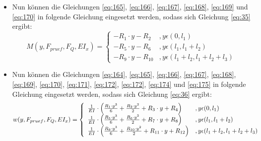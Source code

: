 \begin{itemize}
\begin{equation}
	\end{equation}
	\item Nun können die Gleichungen \ref{eq:165}, \ref{eq:166}, \ref{eq:167}, \ref{eq:168}, \ref{eq:169} und \ref{eq:170} in folgende Gleichung eingesetzt werden, sodass sich Gleichung \ref{eq:35} ergibt:
	\begin{equation}
		M(y,F_{pruef},F_{Q},EI_{x})=\left\{\begin{array}{ll}
			-R_{1}\cdot y - R_{2}&,y\epsilon (0,l_{1})\\
			-R_{5}\cdot y - R_{6}&,y\epsilon (l_{1}, l_{1}+l_{2})\\
			-R_{9}\cdot y - R_{10}&,y\epsilon (l_{1}+l_{2}, l_{1}+l_{2}+l_{3})
		\end{array}\right.
	\end{equation}
	\item Nun können die Gleichungen  \ref{eq:164}, \ref{eq:165}, \ref{eq:166}, \ref{eq:167}, \ref{eq:168}, \ref{eq:169}, \ref{eq:170},  \ref{eq:171},  \ref{eq:172},  \ref{eq:172},  \ref{eq:174} und  \ref{eq:175} in folgende Gleichung eingesetzt werden, sodass sich Gleichung \ref{eq:36} ergibt:
	\begin{equation}
		w(y,F_{pruef},F_{Q},EI_{x})=\left\{\begin{array}{ll}
			\frac{1}{EI}\cdot\Bigl(\frac{R_{1}\cdot y^{3}}{6}+\frac{R_{2}\cdot y^{2}}{2}+R_{3}\cdot y +R_{4}\Bigr)&,y\epsilon (0,l_{1})\\
			\frac{1}{EI}\cdot\Bigl(\frac{R_{5}\cdot y^{3}}{6}+\frac{R_{6}\cdot y^{2}}{2}+R_{7}\cdot y +R_{8}\Bigr)&,y\epsilon (l_{1}, l_{1}+l_{2})\\
			\frac{1}{EI}\cdot\Bigl(\frac{R_{9}\cdot y^{3}}{6}+\frac{R_{10}\cdot y^{2}}{2}+R_{11}\cdot y +R_{12}\Bigr)&,y\epsilon (l_{1}+l_{2}, l_{1}+l_{2}+l_{3})
		\end{array}\right.
	\end{equation}
\end{itemize}
\newpage
